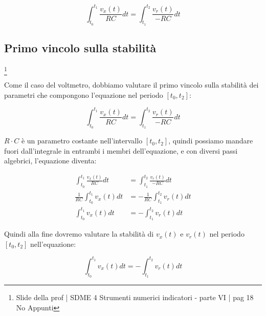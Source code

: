 {
    \Large 
    \begin{equation}
       \int_{t_0}^{t_1} \frac{v_x (t)}{RC} dt 
            = 
        \int_{t_1}^{t_2} \frac{v_r (t)}{- RC} dt  
    \end{equation}
}

\newpage 

\subsection{Primo vincolo sulla stabilità}
\footnote{Slide della prof | SDME 4 Strumenti numerici indicatori - parte VI | pag 18 \\  
No Appunti }

Come il caso del voltmetro, dobbiamo valutare il primo vincolo sulla stabilità dei parametri che compongono l'equazione nel periodo $[t_0, t_2]$: 

{
    \Large 
    \begin{equation}
       \int_{t_0}^{t_1} \frac{v_x (t)}{RC} dt 
            = 
        \int_{t_1}^{t_2} \frac{v_r (t)}{- RC} dt  
    \end{equation}
}

$R \cdot C$ è un parametro costante nell'intervallo $[t_0, t_2]$, 
quindi possiamo mandare fuori dall'integrale in entrambi i membri dell'equazione, e con diversi passi algebrici, 
l'equazione diventa: 

{
    \Large 
    \begin{equation}
        \begin{split}
            \int_{t_0}^{t_1} \frac{v_x (t)}{RC} dt 
            &= 
        \int_{t_1}^{t_2} \frac{v_r (t)}{- RC} dt 
        \\
        \frac{1}{RC}
        \int_{t_0}^{t_1} v_x (t) dt 
        &= 
        - \frac{1}{RC}
        \int_{t_1}^{t_2} v_r (t) dt
        \\
        \int_{t_0}^{t_1} v_x (t) dt 
        &= 
        - 
        \int_{t_1}^{t_2} v_r (t) dt
        \end{split}
    \end{equation}
}

Quindi alla fine dovremo valutare la stabilità di $v_x (t)$ e $v_r (t)$ nel periodo $[t_0, t_2]$ nell'equazione: 

{
    \Large 
    \begin{equation}
       \int_{t_0}^{t_1} v_x (t) dt 
        = 
        - 
        \int_{t_1}^{t_2} v_r (t) dt 
    \end{equation}
}

